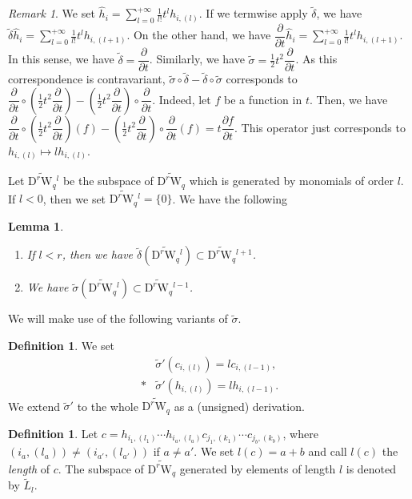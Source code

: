 \documentclass[12pt]{amsart}
\newcommand{\W}{\mathrm{W}}
\newcommand{\D}{\mathrm{D}}
\newcommand{\pdif}[2]{\dfrac{\partial#1}{\partial#2}}
\newtheorem{lemma}[theorem]{Lemma}
\theoremstyle{definition}
\newtheorem{definition}[theorem]{Definition}
\theoremstyle{remark}
\newtheorem{remark}[theorem]{Remark}
\begin{document}
\begin{remark}
We set $\widehat{h}_i=\sum_{l=0}^{+\infty}\frac1{l!}t^lh_{i,(l)}$.
If we termwise apply $\widetilde\delta$, we have $\widetilde\delta\widehat{h}_i=\sum_{l=0}^{+\infty}\frac1{l!}t^lh_{i,(l+1)}$.
On the other hand, we have $\pdif{}{t}\widehat{h}_i=\sum_{l=0}^{+\infty}\frac1{l!}t^lh_{i,(l+1)}$.
In this sense, we have $\widetilde\delta=\pdif{}{t}$.
Similarly, we have $\widetilde\sigma=\frac12t^2\pdif{}{t}$.
As this correspondence is contravariant, $\widetilde\sigma\circ\widetilde\delta-\widetilde\delta\circ\widetilde\sigma$ corresponds to $\pdif{}{t}\circ\left(\frac12t^2\pdif{}{t}\right)-\left(\frac12t^2\pdif{}{t}\right)\circ\pdif{}{t}$.
Indeed, let $f$ be a function in $t$.
Then, we have $\pdif{}{t}\circ\left(\frac12t^2\pdif{}{t}\right)(f)-\left(\frac12t^2\pdif{}{t}\right)\circ\pdif{}{t}(f)=t\pdif{f}{t}$.
This operator just corresponds to $h_{i,(l)}\mapsto lh_{i,(l)}$.
\end{remark}

Let $\widetilde{\D^r\W_q}{}^l$ be the subspace of $\widetilde{\D^r\W_q}$ which is generated by monomials of order $l$.
If $l<0$, then we set $\widetilde{\D^r\W_q}{}^l=\{0\}$.
We have the following

\begin{lemma}
\begin{enumerate}
\item
If $l<r$, then we have $\widetilde\delta(\widetilde{\D^r\W_q}{}^l)\subset\widetilde{\D^r\W_q}{}^{l+1}$.
\item
We have $\widetilde\sigma(\widetilde{\D^r\W_q}{}^l)\subset\widetilde{\D^r\W_q}{}^{l-1}$.
\end{enumerate}
\end{lemma}

We will make use of the following variants of $\widetilde\sigma$.

\begin{definition}
We set
\begin{align*}
&\widetilde\sigma'(c_{i,(l)})=lc_{i,(l-1)},\\*
&\widetilde\sigma'(h_{i,(l)})=lh_{i,(l-1)}.
\end{align*}
We extend $\widetilde\sigma'$ to the whole $\widetilde{\D^r\W_q}$ as a (unsigned) derivation.
\end{definition}

\begin{definition}
\label{def5.8}
Let $c=h_{i_1,(l_1)}\cdots h_{i_a,(l_a)}c_{j_1,(k_1)}\cdots c_{j_b,(k_b)}$, where $(i_a,(l_a))\neq(i_{a'},(l_{a'}))$ if $a\neq a'$.
We set $l(c)=a+b$ and call $l(c)$ the \textit{length} of $c$.
The subspace of $\widetilde{\D^r\W_q}$ generated by elements of length $l$ is denoted by $\widetilde{L}_l$.
\end{definition}
\end{document}
